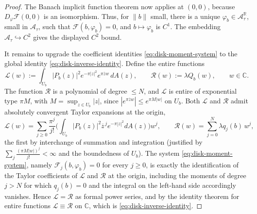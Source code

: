 \documentclass[a4paper,11pt,reqno]{amsart}
\numberwithin{equation}{section}
\theoremstyle{plain} %
\theoremstyle{definition} %
\theoremstyle{remark}
\newcommand{\R}{\mathbb{R}}
\newcommand{\C}{\mathbb{C}}
\begin{document}
\begin{proof}
The Banach implicit function theorem now applies at \((0,0)\), because
\(D_\varphi\mathcal F(0,0)\) is an isomorphism. Thus, for \(\|b\|\) small,
there is a unique \(\varphi_b\in\mathcal A_\tau^\R\), small in
\(\mathcal A_\tau\), such that \(\mathcal F(b,\varphi_b)=0\), and
\(b\mapsto\varphi_b\) is \(C^1\). The embedding
\(\mathcal A_\tau\hookrightarrow C^2\) gives the displayed \(C^2\) bound.

It remains to upgrade the coefficient identities \eqref{eq:disk-moment-system}
to the global identity \eqref{eq:disk-inverse-identity}. Define the entire
functions
\begin{equation}\label{eq:LHS-RHS-entire}
\mathcal L(w):=\int_{U_b}|P_b(z)|^2 e^{-\pi|z|^2}e^{\pi\overline z w}\,dA(z),
\qquad
\mathcal R(w):=\lambda Q_b(w),
\qquad w\in\C.
\end{equation}
The function \(\mathcal R\) is a polynomial of degree \(\le N\), and
\(\mathcal L\) is entire of exponential type \(\pi M\), with
\(M=\sup_{z\in U_b}|z|\), since
\(|e^{\pi\overline z w}|\le e^{\pi M|w|}\) on \(U_b\). Both \(\mathcal L\) and
\(\mathcal R\) admit absolutely convergent Taylor expansions at the origin,
\[
\mathcal L(w)=\sum_{j\ge0}\frac{\pi^j}{j!}
\Big(\!\int_{U_b}\!|P_b(z)|^2\overline z^{\,j}e^{-\pi|z|^2}dA(z)\!\Big)w^j,
\qquad
\mathcal R(w)=\sum_{j=0}^N\lambda q_j(b)\,w^j,
\]
the first by interchange of summation and integration (justified by
\(\sum_j\frac{(\pi M|w|)^j}{j!}<\infty\) and the boundedness of \(U_b\)).
The system \eqref{eq:disk-moment-system}, namely
\(\mathcal F_j(b,\varphi_b)=0\) for every \(j\ge0\), is exactly the
identification of the Taylor coefficients of \(\mathcal L\) and
\(\mathcal R\) at the origin, including the moments of degree \(j>N\) for
which \(q_j(b)=0\) and the integral on the left-hand side accordingly
vanishes. Hence \(\mathcal L=\mathcal R\) as formal power series, and by the
identity theorem for entire functions \(\mathcal L\equiv\mathcal R\) on
\(\C\), which is \eqref{eq:disk-inverse-identity}.


\end{proof}
\end{document}
